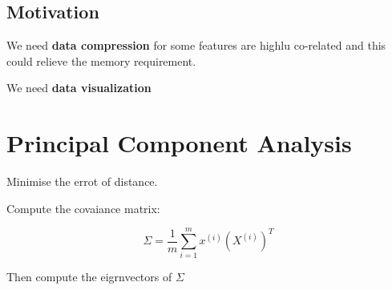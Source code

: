 \documentclass[en,11pt,english,black,simple]{../elegantbook}
\begin{document}
\section{Motivation}

We need \textbf{data compression} for some features are highlu co-related and this could relieve the memory requirement. 

We need \textbf{data visualization} 

\chapter{Principal Component Analysis}

Minimise the errot of distance.

Compute the covaiance matrix:

\[\Sigma = \frac{1}{m}\sum_{i=1}^m x^{(i)}(X^{(i)})^T\] 

Then compute the eigrnvectors of \(\Sigma\) 



\let\chapname\undefined
\ifx\mainclass\undefined
\end{document}
